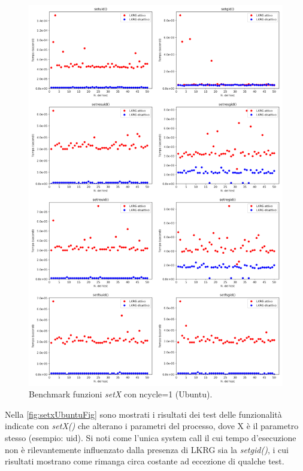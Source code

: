 \begin{figure}[!ht]
\centering
\includegraphics[scale=1.15]{Figures/Ubuntu/SingleSet}
\caption[Benchmark funzioni \emph{setX} con ncycle=1 (Ubuntu)]{Benchmark funzioni \emph{setX} con ncycle=1 (Ubuntu).}
\label{fig:setxUbuntuFig}
\end{figure}

Nella \autoref{fig:setxUbuntuFig} sono mostrati i risultati dei test delle funzionalità indicate con \emph{setX()} che alterano i parametri del processo, dove X è il parametro stesso (esempio: uid). Si noti come l'unica system call il cui tempo d'esecuzione non è rilevantemente influenzato dalla presenza di LKRG sia la \emph{setgid()}, i cui risultati mostrano come rimanga circa costante ad eccezione di qualche test.

